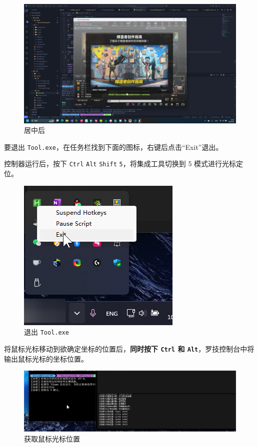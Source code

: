 \begin{figure}[H]
    \Centering
    \includegraphics[width=\textwidth]{assets/after_center.png}
    \caption{居中后}
    \label{ch2fig-after-center}
\end{figure}

要退出 \lstinline{Tool.exe}，在任务栏找到下面的图标，右键后点击“Exit”退出。

控制器运行后，按下 \lstinline{Ctrl} \lstinline{Alt} \lstinline{Shift} \lstinline{5}，将集成工具切换到 5 模式进行光标定位。

\begin{figure}[H]
    \Centering
    \includegraphics[width=\textwidth]{assets/exit_tool.png}
    \caption{退出 \lstinline{Tool.exe}}
\end{figure}

将鼠标光标移动到欲确定坐标的位置后，\textbf{\color{red}同时按下 \lstinline{Ctrl} 和 \lstinline{Alt}}，罗技控制台中将输出鼠标光标的坐标位置。

\begin{figure}[H]
    \Centering
    \includegraphics[width=\textwidth]{assets/position.png}
    \caption{获取鼠标光标位置}
\end{figure}